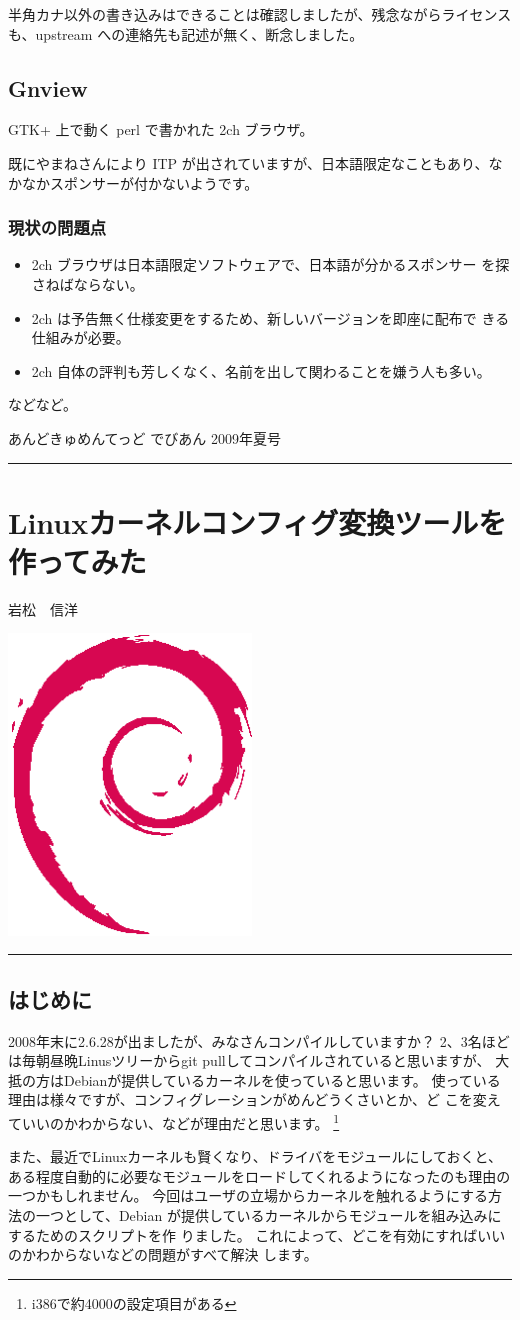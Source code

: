\documentclass[mingoth,a4paper]{jsarticle}
\renewcommand{\dancersection}[2]{%
\newpage
あんどきゅめんてっど でびあん 2009年夏号
%
\vspace{0.1mm}\\
{\color{dancerlightblue}\rule{\hsize}{2mm}}

%
%
\begin{minipage}[t]{0.6\hsize}
\color{dancerdarkblue}
\vspace{1cm}
\section{#1}
\hfill{}#2\\
\end{minipage}
\begin{minipage}[t]{0.4\hsize}
\vspace{-2cm}
\hfill{}\includegraphics[height=8cm]{image200502/openlogo-nd.eps}\\
\vspace{-5cm}
\end{minipage}
%
%
{\color{dancerdarkblue}\rule{0.74\hsize}{2mm}}
%
\vspace{2cm}
}
\begin{document}

半角カナ以外の書き込みはできることは確認しましたが、残念ながらライセンス
も、upstream への連絡先も記述が無く、断念しました。

\subsection{Gnview}

{GTK+ 上で動く perl で書かれた 2ch ブラウザ。}

既にやまねさんにより ITP が出されていますが、日本語限定なこともあり、な
かなかスポンサーが付かないようです。

\subsubsection{現状の問題点}
\begin{itemize}
 \item 2ch ブラウザは日本語限定ソフトウェアで、日本語が分かるスポンサー
       を探さねばならない。
 \item 2ch は予告無く仕様変更をするため、新しいバージョンを即座に配布で
       きる仕組みが必要。
 \item 2ch 自体の評判も芳しくなく、名前を出して関わることを嫌う人も多い。
\end{itemize}
などなど。

\dancersection{Linuxカーネルコンフィグ変換ツールを作ってみた}{岩松　信洋}

\subsection{はじめに}
2008年末に2.6.28が出ましたが、みなさんコンパイルしていますか？
2、3名ほどは毎朝昼晩Linusツリーからgit pullしてコンパイルされていると思いますが、
大抵の方はDebianが提供しているカーネルを使っていると思います。
使っている理由は様々ですが、コンフィグレーションがめんどうくさいとか、ど
こを変えていいのかわからない、などが理由だと思います。
\footnote{i386で約4000の設定項目がある}

また、最近でLinuxカーネルも賢くなり、ドライバをモジュールにしておくと、
ある程度自動的に必要なモジュールをロードしてくれるようになったのも理由の
一つかもしれません。
今回はユーザの立場からカーネルを触れるようにする方法の一つとして、Debian
が提供しているカーネルからモジュールを組み込みにするためのスクリプトを作
りました。
これによって、どこを有効にすればいいのかわからないなどの問題がすべて解決
します。
\end{document}
